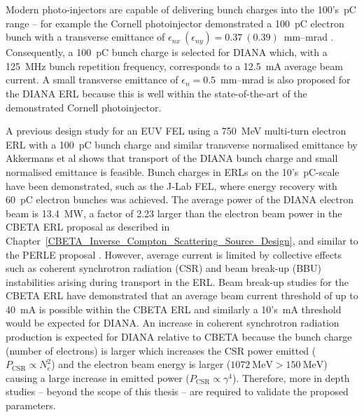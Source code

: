 \documentclass[../main.tex]{subfiles}
\begin{document}
Modern photo-injectors are capable of delivering bunch charges into the 100's~\si{\pico\coulomb} range \cite{angal2018perle,hounsell2021optimization} -- for example the Cornell photoinjector demonstrated a 100~\si{\pico\coulomb} electron bunch with a transverse emittance of $\epsilon_{nx}~\left(\epsilon_{ny}\right) = 0.37~ (0.39)$~\si{\milli\meter}--\si{\milli\radian} \cite{bartnik2015operational}. Consequently, a 100~\si{\pico\coulomb} bunch charge is selected for DIANA which, with a 125~\si{\mega\hertz} bunch repetition frequency, corresponds to a 12.5~\si{\milli\ampere} average beam current. A small transverse emittance of $\epsilon_{n}=0.5$~\si{\milli\meter}--\si{\milli\radian} is also proposed for the DIANA ERL because this is well within the state-of-the-art of the demonstrated Cornell photoinjector.

A previous design study for an EUV FEL using a 750~\si{\mega\electronvolt} multi-turn electron ERL with a 100~\si{\pico\coulomb} bunch charge and similar transverse normalised emittance by Akkermans et al\cite{akkermans2017compact} shows that transport of the DIANA bunch charge and small normalised emittance is feasible. Bunch charges in ERLs on the 10's~\si{\pico\coulomb}-scale have been demonstrated, such as the J-Lab FEL, where energy recovery with 60~\si{\pico\coulomb} electron bunches \cite{benson1999first} was achieved. The average power of the DIANA electron beam is 13.4~\si{\mega\watt}, a factor of 2.23 larger than the electron beam power in the CBETA ERL proposal as described in Chapter~\ref{CBETA_Inverse_Compton_Scattering_Source_Design}, and similar to the PERLE proposal \cite{angal2018perle}. However, average current is limited by collective effects such as coherent synchrotron radiation (CSR) and beam break-up (BBU) instabilities arising during transport in the ERL. Beam break-up studies for the CBETA ERL have demonstrated that an average beam current threshold of up to 40~\si{\milli\ampere} is possible within the CBETA ERL \cite{lou2019beam} and similarly a 10's~\si{\milli\ampere} threshold would be expected for DIANA. An increase in coherent synchrotron radiation production is expected for DIANA relative to CBETA because the bunch charge (number of electrons) is larger which increases the CSR power emitted ($P_{\mathrm{CSR}} \propto N_{e}^{2}$) and the electron beam energy is larger ($1072~\mathrm{\si{\mega\electronvolt}} > 150~\mathrm{\si{\mega\electronvolt}}$) causing a large increase in emitted power ($P_{\mathrm{CSR}}\propto \gamma^{4}$). Therefore, more in depth studies -- beyond the scope of this thesis -- are required to validate the proposed parameters. 
\end{document}
